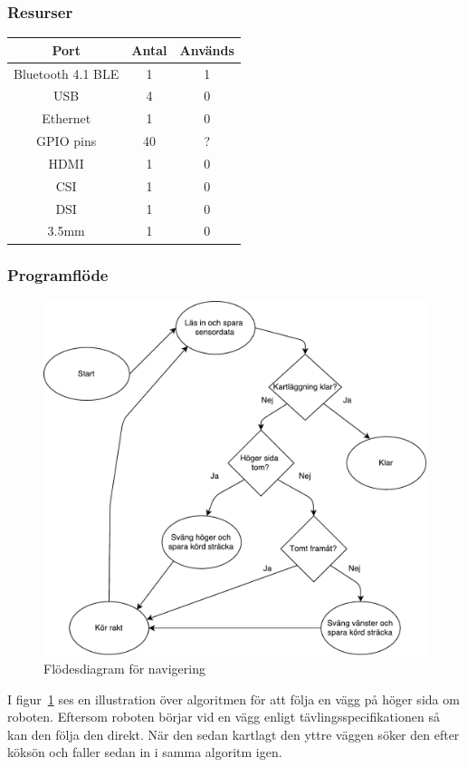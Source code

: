 \documentclass{article}
\begin{document}
\subsubsection{Resurser}

\begin{table}[H]
   \centering
  \begin{tabular}{ | c | c | c | }
    \hline
    \textbf{Port} & \textbf{Antal} & \textbf{Används} \\
    \hline
    Bluetooth 4.1 BLE & 1 & 1\\
    USB & 4 & 0 \\
    Ethernet & 1 & 0 \\
    GPIO pins & 40 & ? \\
    HDMI & 1 & 0 \\
    CSI & 1 & 0 \\
    DSI & 1 & 0 \\
    3.5mm & 1 & 0 \\
    \hline
  \end{tabular}
\end{table}

\subsubsection{Programflöde}
\begin{figure}[H]
\centering
\includegraphics[scale=0.6]{navigering_flowchart}
\caption{Flödesdiagram för navigering}
\label{fig:navigering_flowchart}
\end{figure}
I figur~\ref{fig:navigering_flowchart} ses en illustration över algoritmen för att följa en vägg på höger sida om roboten. Eftersom roboten börjar vid en vägg enligt tävlingsspecifikationen så kan den följa den direkt. När den sedan kartlagt den yttre väggen söker den efter köksön och faller sedan in i samma algoritm igen.
\end{document}
